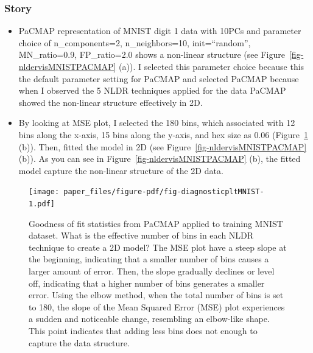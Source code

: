 \documentclass[
  12pt]{article}
\begin{document}
\hypertarget{story-1}{%
\subsubsection{Story}\label{story-1}}

\begin{itemize}
\item
  PaCMAP representation of MNIST digit 1 data with 10PCs and parameter
  choice of n\_components=2, n\_neighbors=10, init=``random'',
  MN\_ratio=0.9, FP\_ratio=2.0 shows a non-linear structure (see
  Figure~\ref{fig-nldervisMNISTPACMAP} (a)). I selected this parameter
  choice because this the default parameter setting for PaCMAP and
  selected PaCMAP because when I observed the 5 NLDR techniques applied
  for the data PaCMAP showed the non-linear structure effectively in 2D.
\item
  By looking at MSE plot, I selected the 180 bins, which associated with
  12 bins along the x-axis, 15 bins along the y-axis, and hex size as
  0.06 (Figure~\ref{fig-diagnosticpltMNIST} (b)). Then, fitted the model
  in 2D (see Figure~\ref{fig-nldervisMNISTPACMAP} (b)). As you can see
  in Figure~\ref{fig-nldervisMNISTPACMAP} (b), the fitted model capture
  the non-linear structure of the 2D data.
\end{itemize}

\begin{figure}

{\centering \texttt{[image: paper\_files/figure-pdf/fig-diagnosticpltMNIST-1.pdf]}

}

\caption{\label{fig-diagnosticpltMNIST}Goodness of fit statistics from
PaCMAP applied to training MNIST dataset. What is the effective number
of bins in each NLDR technique to create a 2D model? The MSE plot have a
steep slope at the beginning, indicating that a smaller number of bins
causes a larger amount of error. Then, the slope gradually declines or
level off, indicating that a higher number of bins generates a smaller
error. Using the elbow method, when the total number of bins is set to
180, the slope of the Mean Squared Error (MSE) plot experiences a sudden
and noticeable change, resembling an elbow-like shape. This point
indicates that adding less bins does not enough to capture the data
structure.}

\end{figure}
\end{document}
